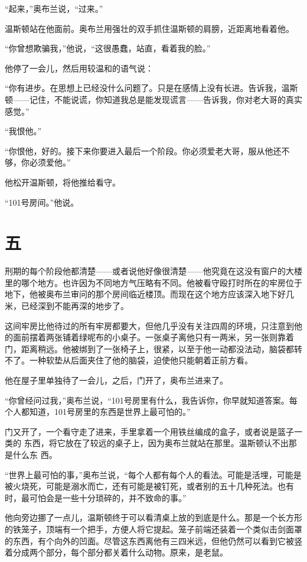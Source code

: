 ``起来，''奥布兰说，``过来。''

温斯顿站在他面前。奥布兰用强壮的双手抓住温斯顿的肩膀，近距离地看着他。

``你曾想欺骗我，''他说，``这很愚蠢，站直，看着我的脸。''

他停了一会儿，然后用较温和的语气说：

``你有进步。在思想上已经没什么问题了。只是在感情上没有长进。告诉我，温斯顿——记住，不能说谎，你知道我总是能发现谎言——告诉我，你对老大哥的真实感觉。''

``我恨他。''

``你恨他，好的。接下来你要进入最后一个阶段。你必须爱老大哥，服从他还不够，你必须爱他。''

他松开温斯顿，将他推给看守。

``101号房间。''他说。

\section*{五}\label{ux4e8cux5341ux4e09}

刑期的每个阶段他都清楚——或者说他好像很清楚——他究竟在这没有窗户的大楼里的哪个地方。也许因为不同地方气压略有不同。他被看守殴打时所在的牢房位于地下，他被奥布兰审问的那个房间临近楼顶。而现在这个地方应该深入地下好几米，已经深到不能再深的地步了。

这间牢房比他待过的所有牢房都要大，但他几乎没有关注四周的环境，只注意到他的面前摆着两张铺着绿呢布的小桌子。一张桌子离他只有一两米，另一张则靠着门，距离稍远。他被绑到了一张椅子上，很紧，以至于他一动都没法动，脑袋都转不了。一种软垫从后面夹住了他的脑袋，迫使他只能朝着正前方看。

他在屋子里单独待了一会儿，之后，门开了，奥布兰进来了。

``你曾经问过我，''奥布兰说，``101号房里有什么，我告诉你，你早就知道答案。每
个人都知道，101号房里的东西是世界上最可怕的。''

门又开了，一个看守走了进来，手里拿着一个用铁丝编成的盒子，或者说是篮子一类的
东西，将它放在了较远的桌子上，因为奥布兰就站在那里。温斯顿认不出那是什么东
西。

``世界上最可怕的事，''奥布兰说，``每个人都有每个人的看法。可能是活埋，可能是被火烧死，可能是溺水而亡，还有可能是被钉死，或者别的五十几种死法。也有时，最可怕会是一些十分琐碎的，并不致命的事。''

他向旁边挪了一点儿，温斯顿终于可以看清桌上放的到底是什么。那是一个长方形的铁笼子，顶端有一个把手，方便人将它提起。笼子前端还装着一个类似击剑面罩的东西，有个向外的凹面。尽管这东西离他有三四米远，但他仍然可以看到它被竖着分成两个部分，每个部分都关着什么动物。原来，是老鼠。

